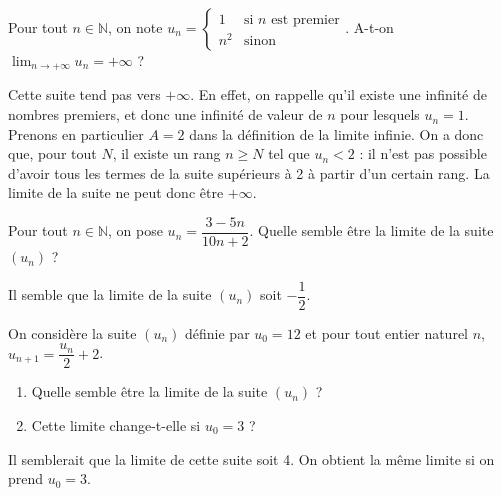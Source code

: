 \documentclass[11pt,fleqn]{book} %
\begin{document}
\begin{exercise}[topic=lim01]Pour tout $n\in\mathbb{N}$, on note $u_n=\left\{\begin{array}{ll} 1 & \text{si } n \text{ est premier}\\
n^2 & \text{sinon}

\end{array}\right.$. A-t-on $\displaystyle \lim _{n\to +\infty} u_n = +\infty$ ?\end{exercise}
\begin{solution}Cette suite tend pas vers $+\infty$. En effet, on rappelle qu'il existe une infinité de nombres premiers, et donc une infinité de valeur de $n$ pour lesquels $u_n = 1$. Prenons en particulier $A=2$ dans la définition de la limite infinie. On a donc que, pour tout $N$, il existe un rang $n \geqslant N$ tel que $u_n < 2$ : il n'est pas possible d'avoir tous les termes de la suite supérieurs à 2 à partir d'un certain rang. La limite de la suite ne peut donc être $+\infty$. \end{solution}




\begin{exercise}[topic=lim01]Pour tout $n\in\mathbb{N}$, on pose $u_n=\dfrac{3-5n}{10n+2}$. Quelle semble être la limite de la suite $(u_n)$ ?\end{exercise}
\begin{solution}Il semble que la limite de la suite $(u_n)$ soit $-\dfrac{1}{2}$.\end{solution}



\begin{exercise}[topic=lim01]On considère la suite $(u_n)$ définie par $u_0=12$ et pour tout entier naturel $n$, $u_{n+1}= \dfrac{u_n}{2}+2$. 

\begin{enumerate}
\item Quelle semble être la limite de la suite $(u_n)$ ?
\item Cette limite change-t-elle si $u_0=3$ ?\end{enumerate}\end{exercise}
\begin{solution}Il semblerait que la limite de cette suite soit 4. On obtient la même limite si on prend $u_0=3$.\end{solution}
\end{document}
